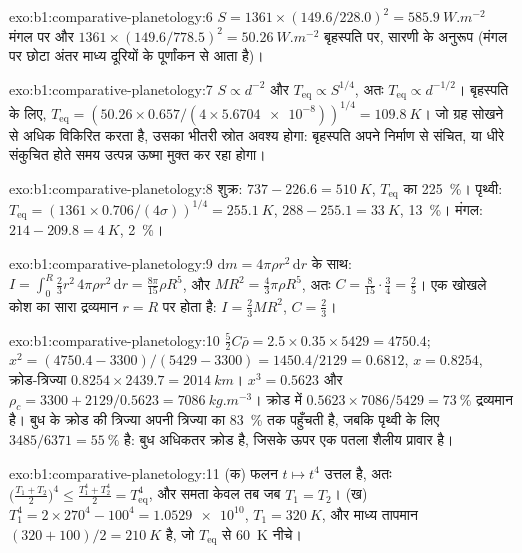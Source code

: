 \begin{solution}{exo:b1:comparative-planetology:6}
$S = 1361\times(149.6/228.0)^2 = \qty{585.9}{W.m^{-2}}$ मंगल पर और
$1361\times(149.6/778.5)^2 = \qty{50.26}{W.m^{-2}}$ बृहस्पति पर, सारणी के अनुरूप (मंगल पर छोटा अंतर माध्य
दूरियों के पूर्णांकन से आता है)।
\end{solution}

\begin{solution}{exo:b1:comparative-planetology:7}
$S \propto d^{-2}$ और $T_\mathrm{eq} \propto S^{1/4}$, अतः $T_\mathrm{eq}
\propto d^{-1/2}$। बृहस्पति के लिए, $T_\mathrm{eq} = (50.26\times0.657/(4\times
\num{5.6704e-8}))^{1/4} = \qty{109.8}{K}$। जो ग्रह सोखने से अधिक विकिरित करता है, उसका भीतरी स्रोत
अवश्य होगा: बृहस्पति अपने निर्माण से संचित, या धीरे संकुचित होते समय उत्पन्न ऊष्मा मुक्त कर रहा होगा।
\end{solution}

\begin{solution}{exo:b1:comparative-planetology:8}
शुक्र: $737 - 226.6 = \qty{510}{K}$, $T_\mathrm{eq}$ का \qty{225}{\percent}।
पृथ्वी: $T_\mathrm{eq} = (1361\times0.706/(4\sigma))^{1/4} = \qty{255.1}{K}$,
$288 - 255.1 = \qty{33}{K}$, \qty{13}{\percent}। मंगल: $214 - 209.8 =
\qty{4}{K}$, \qty{2}{\percent}।
\end{solution}

\begin{solution}{exo:b1:comparative-planetology:9}
$\mathrm dm = 4\pi\rho r^2\,\mathrm dr$ के साथ: $I = \int_0^R\tfrac23r^2\,4\pi
\rho r^2\,\mathrm dr = \tfrac{8\pi}{15}\rho R^5$, और $MR^2 = \tfrac43\pi\rho
R^5$, अतः $C = \tfrac{8}{15}\cdot\tfrac34 = \tfrac25$। एक खोखले कोश का सारा द्रव्यमान $r = R$ पर
होता है: $I = \tfrac23MR^2$, $C = \tfrac23$।
\end{solution}

\begin{solution}{exo:b1:comparative-planetology:10}
$\tfrac52C\bar\rho = 2.5\times0.35\times5429 = 4750.4$;
$x^2 = (4750.4 - 3300)/(5429 - 3300) = 1450.4/2129 = 0.6812$, $x = 0.8254$,
क्रोड-त्रिज्या $0.8254\times2439.7 = \qty{2014}{km}$। $x^3 = 0.5623$ और
$\rho_c = 3300 + 2129/0.5623 = \qty{7086}{kg.m^{-3}}$। क्रोड में
$0.5623\times7086/5429 = \qty{73}{\percent}$ द्रव्यमान है। बुध के क्रोड की त्रिज्या अपनी त्रिज्या का
\qty{83}{\percent} तक पहुँचती है, जबकि पृथ्वी के लिए $3485/6371 =
\qty{55}{\percent}$ है: बुध अधिकतर क्रोड है, जिसके ऊपर एक पतला शैलीय प्रावार है।
\end{solution}

\begin{solution}{exo:b1:comparative-planetology:11}
(क) फलन $t\mapsto t^4$ उत्तल है, अतः
$\bigl(\tfrac{T_1 + T_2}{2}\bigr)^4 \le \tfrac{T_1^4 + T_2^4}{2} =
T_\mathrm{eq}^4$, और समता केवल तब जब $T_1 = T_2$। (ख) $T_1^4 =
2\times270^4 - 100^4 = \num{1.0529e10}$, $T_1 = \qty{320}{K}$, और माध्य तापमान
$(320 + 100)/2 = \qty{210}{K}$ है, जो $T_\mathrm{eq}$ से \qty{60}{K} नीचे।
\end{solution}

